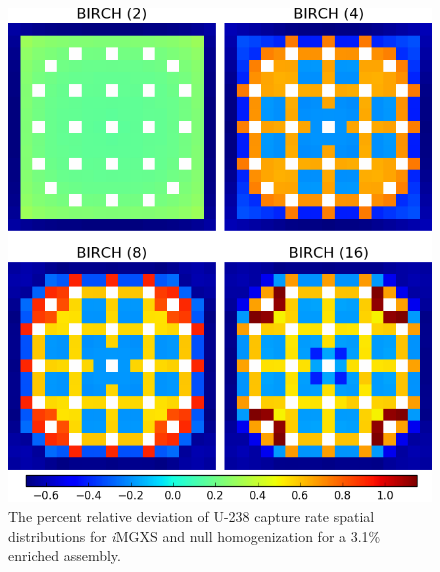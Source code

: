 \begin{figure}[h!]
\centering
\includegraphics[width=0.9\linewidth]{figures/results/compare/assm-31/compare-capt}
\vspace{2mm}
\caption[U-238 capture rate \textit{i}MGXS-to-null relative deviations]{The percent relative deviation of U-238 capture rate spatial distributions for \textit{i}\ac{MGXS} and null homogenization for a 3.1\% enriched assembly.}
\label{fig:chap11-assm-3.1-capt-rates-comp}
\end{figure}

\clearpage

